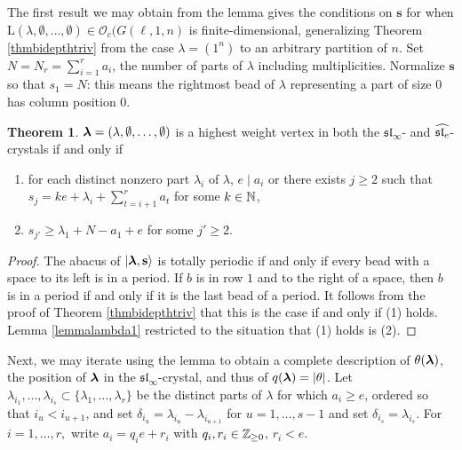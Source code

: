 \documentclass[12pt]{amsart}
\numberwithin{equation}{section}
\theoremstyle{definition}
\newtheorem{theorem}[equation]{Theorem}
\newcommand{\oh}{\mathcal{O}}
\newcommand{\el}{\mathrm{L}}
\newcommand{\emp}{\emptyset}
\newcommand{\slinf}{\mathfrak{sl}_\infty}
\newcommand{\mbs}{\mathbf{s}}
\begin{document}
The first result we may obtain from the lemma gives the conditions on $\mbs$ for when $\el(\lambda,\emp,\dots,\emp)\in\oh_c(G(\ell,1,n)$ is finite-dimensional, generalizing Theorem \ref{thmbidepthtriv} from the case $\lambda=(1^n)$ to an arbitrary partition of $n$.
Set $N=N_r=\sum_{i=1}^r a_i$, the number of parts of $\lambda$ including multiplicities.
Normalize $\mbs$ so that $s_1=N$: this means the rightmost bead of $\lambda$ representing a part of size $0$ has column position $0$. 
\begin{theorem}\label{firstcompfd} $\bla=(\lambda,\emp,\dots,\emp)$ is a highest weight vertex in both the $\slinf$- and $\widehat{\mathfrak{sl}_e}$-crystals if and only if 
\begin{enumerate}
\item for each distinct nonzero part $\lambda_i$ of $\lambda$, $e\mid a_i$ or there exists $j\geq 2$ such that\\ $s_j=
ke+\lambda_i+\sum_{t=i+1}^r a_t$ for some $k\in\mathbb{N}$,
\item $s_{j'}\geq
\lambda_1+N-a_1+e$ for some $j'\geq 2$.
\end{enumerate}
\end{theorem}
\begin{proof}
The abacus of $|\bla,\mbs\rangle$ is totally periodic if and only if every bead with a space to its left is in a period. If $b$ is in row $1$ and to the right of a space, then $b$ is in a period if and only if it is the last bead of a period. It follows from the proof of Theorem \ref{thmbidepthtriv} that this is the case if and only if (1) holds. Lemma \ref{lemmalambda1} restricted to the situation that (1) holds is (2). 
\end{proof}

Next, we may iterate using the lemma to obtain a complete description of $\theta(\boldsymbol{\lambda})$, the position of $\boldsymbol{\lambda}$ in the $\slinf$-crystal, and thus of $q(\boldsymbol{\lambda})=|\theta|$. Let $\lambda_{i_1},\dots,\lambda_{i_s}\subset\{\lambda_1,\dots,\lambda_r\}$ be the distinct parts of $\lambda$ for which $a_i\geq e$, ordered so that $i_u<i_{u+1}$, and set $\delta_{i_u}=\lambda_{i_u}-\lambda_{i_{u+1}}$ for $u=1,\dots,s-1$ and set $\delta_{i_s}=\lambda_{i_s}$. For $i=1,\dots, r,$ write 
$a_i=q_ie+r_i$
with $q_i,r_i\in\mathbb{Z}_{\geq0}$, $r_i<e$.
\end{document}
